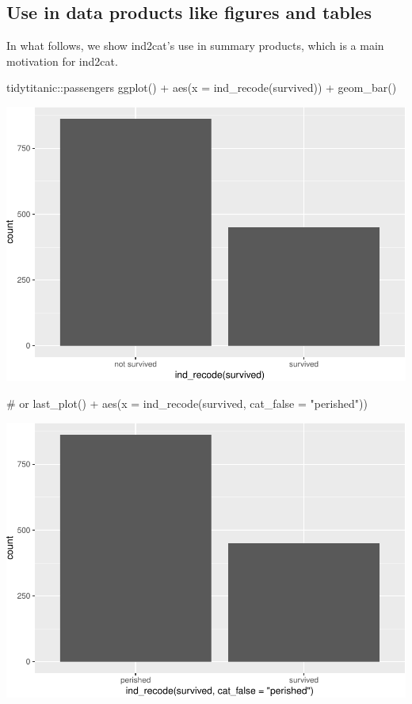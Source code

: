\hypertarget{use-in-data-products-like-figures-and-tables}{%
\subsection{Use in data products like figures and
tables}\label{use-in-data-products-like-figures-and-tables}}

In what follows, we show ind2cat's use in summary products, which is a
main motivation for ind2cat.

\begin{Schunk}
\begin{Sinput}
tidytitanic::passengers %
ggplot() + 
  aes(x = ind_recode(survived)) + 
  geom_bar()
\end{Sinput}

\includegraphics[width=0.69\linewidth]{r_journal_files/figure-latex/visual_ind2cat_improves-1} \end{Schunk}

\begin{Schunk}
\begin{Sinput}
# or
last_plot() +
  aes(x = ind_recode(survived, cat_false = "perished"))
\end{Sinput}

\includegraphics[width=0.69\linewidth]{r_journal_files/figure-latex/visual_ind2cat_improves_cat_false-1} \end{Schunk}

